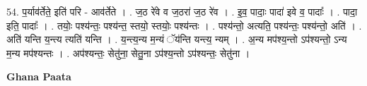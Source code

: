 \documentclass[17pt]{extarticle}
\begin{document}
54. प॒र्याव॑र्तेते॒ इति॑ परि - आव॑र्तेते । . ज॒ठ रे॑वे व ज॒ठरा॑ ज॒ठ रे॑व । . इ॒व॒ पादाः॒ पादा॑ इवे व॒ पादाः᳚ । . पादा॒ इति॒ पादाः᳚ । . तयोः॒ पश्य॑न्तः॒ पश्य॑न्त॒ स्तयो॒ स्तयोः॒ पश्य॑न्तः । . पश्य॑न्तो॒ अत्यति॒ पश्य॑न्तः॒ पश्य॑न्तो॒ अति॑ । . अति॑ यन्ति य॒न्त्य त्यति॑ यन्ति । . य॒न्त्य॒न्य म॒न्यं ॅय॑न्ति यन्त्य॒ न्यम् । . अ॒न्य मप॑श्य॒न्तो ऽप॑श्यन्तो॒ ऽन्य म॒न्य मप॑श्यन्तः । . अप॑श्यन्तः॒ सेतु॑ना॒ सेतु॒ना ऽप॑श्य॒न्तो ऽप॑श्यन्तः॒ सेतु॑ना । \newline

\textbf{Ghana Paata } \newline
\end{document}
